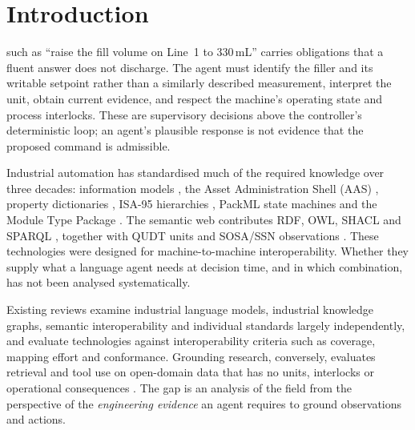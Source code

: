 \section{Introduction}
\label{sec:intro}

 such as ``raise the fill volume on Line~1 to 330\,mL'' carries obligations that a
fluent answer does not discharge. The agent must identify the filler and its writable
setpoint rather than a similarly described measurement, interpret the unit, obtain current
evidence, and respect the machine's operating state and process interlocks. These are
supervisory decisions above the controller's deterministic loop; an agent's plausible
response is not evidence that the proposed command is admissible.

Industrial automation has standardised much of the required knowledge over three decades:
\opcua{} information models \cite{iec62541}, the Asset Administration Shell (AAS)
\cite{idta2023aas}, property dictionaries \cite{eclass,iec61360}, ISA-95 hierarchies
\cite{iec62264}, PackML state machines \cite{isa88} and the Module Type Package
\cite{vdi2658}. The semantic web contributes RDF, OWL, SHACL and SPARQL
\cite{w3c2014rdf,w3c2012owl,knublauch2017shacl,w3c2013sparql}, together with QUDT units
\cite{qudt} and SOSA/SSN observations \cite{haller2019ssn}. These technologies were designed
for machine-to-machine interoperability. Whether they supply what a language agent needs at
decision time, and in which combination, has not been analysed systematically.

Existing reviews examine industrial language models, industrial knowledge graphs,
semantic interoperability and individual standards largely independently, and evaluate
technologies against interoperability criteria such as coverage, mapping effort and
conformance. Grounding research, conversely, evaluates retrieval and tool use on
open-domain data that has no units, interlocks or operational consequences
\cite{lewis2020rag,edge2024graphrag,pan2024unifying,patil2024gorilla}. The gap is an
analysis of the field from the perspective of the \emph{engineering evidence} an agent
requires to ground observations and actions.

